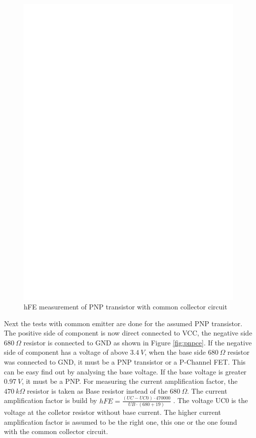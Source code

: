 \begin{figure}[H]
\centering
\includegraphics[]{../FIG/PNPcc.eps}
\caption{hFE measurement of PNP transistor with common collector circuit }
\label{fig:pnpcc}
\end{figure}

Next the tests with common emitter are done for the assumed PNP transistor.
The positive side of component is now direct connected to VCC, the negative side \(680~\Omega\) resistor
is connected to GND as shown in Figure \ref{fig:pnpce}. 
If the negative side of component has a voltage of above \(3.4~V\), when the base side \(680~\Omega\) resistor 
was connected to GND, it must be a PNP transistor or a P-Channel FET.
This can be easy find out by analysing the base voltage. If the base voltage is greater \(0.97~V\), it must be a PNP.
For measuring the current amplification factor, the \(470~k\Omega\) resistor is taken as Base resistor
instead of the \(680~\Omega\).
The current amplification factor is build by \(hFE = \frac{(UC-UC0) \cdot 470000}{UB \cdot (680+19)}\) .
The voltage UC0 is the voltage at the colletor resistor without base current.
The higher current amplification factor is assumed to be the right one, this one or the one found with
the common collector circuit.


